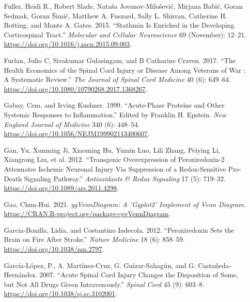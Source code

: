 \documentclass[9pt,lineno]{elife}
\newlength{\cslhangindent}
\newlength{\cslentryspacingunit} %
\newenvironment{CSLReferences}[2] %
 {%
  \setlength{\parindent}{0pt}
  \ifodd #1
  \let\oldpar\par
  \def\par{\hangindent=\cslhangindent\oldpar}
  \fi
  \setlength{\parskip}{#2\cslentryspacingunit}
 }%
 {}
\begin{document}
\begin{CSLReferences}{1}{0}
\leavevmode{}%
Fuller, Heidi R., Robert Slade, Nataša Jovanov-Milošević, Mirjana Babić, Goran Sedmak, Goran Šimić, Matthew A. Fuszard, Sally L. Shirran, Catherine H. Botting, and Monte A. Gates. 2015. {``Stathmin Is Enriched in the Developing Corticospinal Tract.''} \emph{Molecular and Cellular Neuroscience} 69 (November): 12--21. \url{https://doi.org/10.1016/j.mcn.2015.09.003}.

\leavevmode{}%
Furlan, Julio C, Sivakumar Gulasingam, and B Catharine Craven. 2017. {``The {Health Economics} of the Spinal Cord Injury or Disease Among Veterans of War : {A} Systematic Review.''} \emph{The Journal of Spinal Cord Medicine} 40 (6): 649--64. \url{https://doi.org/10.1080/10790268.2017.1368267}.

\leavevmode{}%
Gabay, Cem, and Irving Kushner. 1999. {``Acute-{Phase Proteins} and {Other Systemic Responses} to {Inflammation}.''} Edited by Franklin H. Epstein. \emph{New England Journal of Medicine} 340 (6): 448--54. \url{https://doi.org/10.1056/NEJM199902113400607}.

\leavevmode{}%
Gan, Yu, Xunming Ji, Xiaoming Hu, Yumin Luo, Lili Zhang, Peiying Li, Xiangrong Liu, et al. 2012. {``Transgenic {Overexpression} of {Peroxiredoxin-2 Attenuates Ischemic Neuronal Injury Via Suppression} of a {Redox-Sensitive Pro-Death Signaling Pathway}.''} \emph{Antioxidants \& Redox Signaling} 17 (5): 719--32. \url{https://doi.org/10.1089/ars.2011.4298}.

\leavevmode{}%
Gao, Chun-Hui. 2021. \emph{ggVennDiagram: A 'Ggplot2' Implement of Venn Diagram}. \url{https://CRAN.R-project.org/package=ggVennDiagram}.

\leavevmode{}%
Garcia-Bonilla, Lidia, and Costantino Iadecola. 2012. {``Peroxiredoxin Sets the Brain on Fire After Stroke.''} \emph{Nature Medicine} 18 (6): 858--59. \url{https://doi.org/10.1038/nm.2797}.

\leavevmode{}%
García-López, P., A. Martínez-Cruz, G. Guízar-Sahagún, and G. Castañeda-Hernández. 2007. {``Acute Spinal Cord Injury Changes the Disposition of Some, but Not All Drugs Given Intravenously.''} \emph{Spinal Cord} 45 (9): 603--8. \url{https://doi.org/10.1038/sj.sc.3102001}.


\end{CSLReferences}
\end{document}
